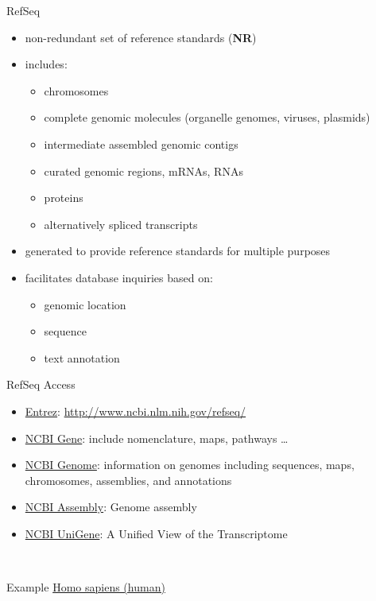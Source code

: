 \begin{frame}{RefSeq}

\begin{itemize}
\item
  non-redundant set of reference standards (\textbf{NR})
\item
  includes:

  \begin{itemize}
  \itemsep1pt\parskip0pt
  \item
    chromosomes
  \item
    complete genomic molecules (organelle genomes, viruses, plasmids)
  \item
    intermediate assembled genomic contigs
  \item
    curated genomic regions, mRNAs, RNAs
  \item
    proteins
  \item
    alternatively spliced transcripts
  \end{itemize}
\item
  generated to provide reference standards for multiple purposes
\item
  facilitates database inquiries based on:

  \begin{itemize}
  \itemsep1pt\parskip0pt
  \item
    genomic location
  \item
    sequence
  \item
    text annotation
  \end{itemize}
\end{itemize}

\end{frame}

\begin{frame}{RefSeq Access}

\begin{itemize}
\itemsep1pt\parskip0pt
\item
  \href{http://www.ncbi.nlm.nih.gov/}{Entrez}:
  \url{http://www.ncbi.nlm.nih.gov/refseq/}
\item
  \href{http://www.ncbi.nlm.nih.gov/gene}{NCBI Gene}: include
  nomenclature, maps, pathways \ldots{}
\item
  \href{http://www.ncbi.nlm.nih.gov/genome/}{NCBI Genome}: information
  on genomes including sequences, maps, chromosomes, assemblies, and
  annotations
\item
  \href{http://www.ncbi.nlm.nih.gov/assembly/}{NCBI Assembly}: Genome
  assembly
\item
  \href{http://www.ncbi.nlm.nih.gov/unigene}{NCBI UniGene}: A Unified
  View of the Transcriptome
\end{itemize}

~

Example \href{http://www.ncbi.nlm.nih.gov/genome/51}{Homo sapiens
(human)}

\end{frame}

